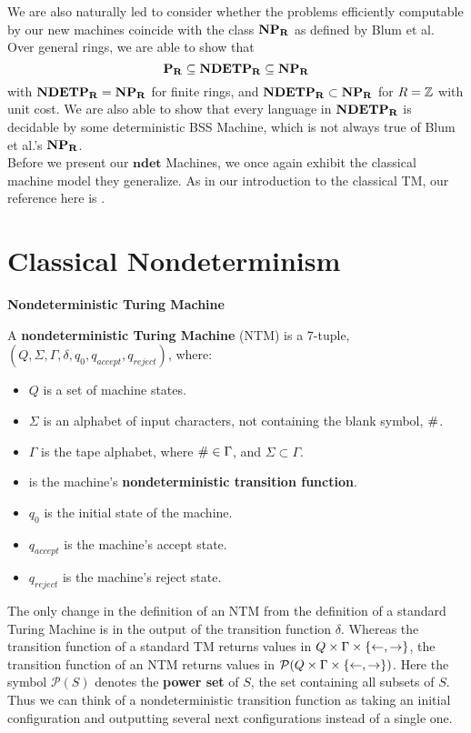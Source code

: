 We are also naturally led to consider whether the problems efficiently
computable by our new machines coincide with the class $\mathbf{NP_R}$ as
defined by Blum et al.  Over general rings, we are able to show that
$$\mathbf{P_R} \subseteq \mathbf{NDETP_R} \subseteq \mathbf{NP_R}$$
with $\mathbf{NDETP_R} = \mathbf{NP_R}$ for finite rings, and $\mathbf{NDETP_R} \subset \mathbf{NP_R}$ for $R
= \mathbb{Z}$ with unit cost.  We are also able to show that every
language in $\mathbf{NDETP_R}$ is decidable by some deterministic BSS Machine,
which is not always true of Blum et al.'s $\mathbf{NP_R}$.\\

Before we present our $\mathbf{ndet}$ Machines, we once again exhibit
the classical machine model they generalize.  As in our introduction
to the classical TM, our reference here is \cite{S06}.

\section{Classical Nondeterminism}

\begin{definition}{\textbf{Nondeterministic Turing Machine}}
  
  A \textbf{nondeterministic Turing Machine} (NTM) is a 7-tuple, $(Q,
  \Sigma, \Gamma, \delta, q_0, q_{accept}, q_{reject})$, where:
  
  \begin{itemize}
  \item $Q$ is a set of machine states.
  \item $\Sigma$ is an alphabet of input characters, not containing
    the blank symbol, $\#$.
  \item $\Gamma$ is the tape alphabet, where $\# \in \Gamma$, and
    $\Sigma \subset \Gamma$.
  \item {} is the machine's
    \textbf{nondeterministic transition function}.
  \item $q_0$ is the initial state of the machine.
  \item $q_{accept}$ is the machine's accept state.
  \item $q_{reject}$ is the machine's reject state.
  \end{itemize}
  
\end{definition}

The only change in the definition of an NTM from the definition of a
standard Turing Machine is in the output of the transition function
$\delta$.  Whereas the transition function of a standard TM returns
values in $Q \times \Gamma \times \{\leftarrow, \rightarrow\}$, the
transition function of an NTM returns values in $\mathcal{P}(Q \times
  \Gamma \times \{\leftarrow, \rightarrow\})$.  Here the symbol
$\mathcal{P}(S)$ denotes the \textbf{power set} of $S$, the set
containing all subsets of $S$.  Thus we can think of a
nondeterministic transition function as taking an initial
configuration and outputting several next configurations instead of a
single one.\\

